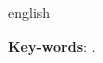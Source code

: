 \begin{resumo}[Abstract]
  \begin{otherlanguage*}{english}  

  \vspace{\onelineskip}
 
  \noindent 
  \textbf{Key-words}: .
  \end{otherlanguage*}
\end{resumo}
